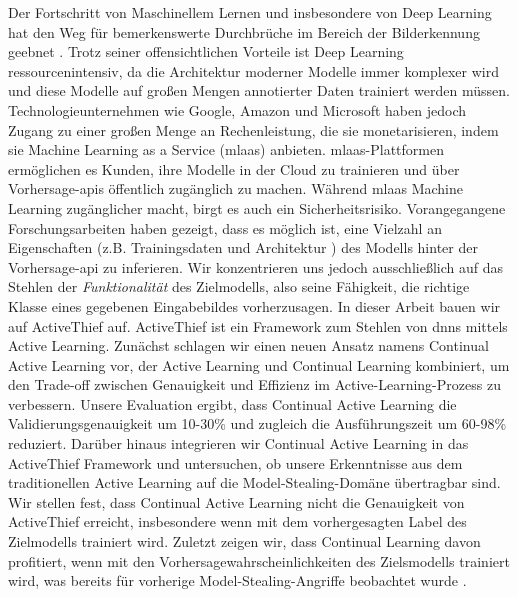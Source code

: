 
\Abstract
Der Fortschritt von Maschinellem Lernen und insbesondere von Deep Learning hat den Weg für bemerkenswerte Durchbrüche im Bereich der Bilderkennung geebnet
\parencite{goodfellow2020generative,he2016deep,lecun1989backpropagation}. Trotz seiner offensichtlichen Vorteile ist Deep Learning ressourcenintensiv, da
die Architektur moderner Modelle immer komplexer wird und diese Modelle auf großen Mengen annotierter Daten trainiert werden müssen. Technologieunternehmen wie Google,
Amazon und Microsoft haben jedoch Zugang zu einer großen Menge an Rechenleistung, die sie monetarisieren, indem sie Machine Learning as a Service (\gls{mlaas}) anbieten.
\gls{mlaas}-Plattformen ermöglichen es Kunden, ihre Modelle in der Cloud zu trainieren und über Vorhersage-\glspl{api} öffentlich zugänglich zu machen.
Während \gls{mlaas} Machine Learning zugänglicher macht, birgt es auch ein Sicherheitsrisiko. Vorangegangene Forschungsarbeiten haben gezeigt, dass es möglich ist,
eine Vielzahl an Eigenschaften (z.B. Trainingsdaten \cite{shokri2017membership} und Architektur \cite{oh2019towards}) des Modells hinter der Vorhersage-\gls{api}
\parencite{papernot2017practical,tramer2016stealing} zu inferieren. Wir konzentrieren uns jedoch ausschließlich auf das Stehlen der \textit{Funktionalität} des Zielmodells,
also seine Fähigkeit, die richtige Klasse eines gegebenen Eingabebildes vorherzusagen. In dieser Arbeit bauen wir auf ActiveThief \cite{pal2020activethief} auf. ActiveThief
ist ein Framework zum Stehlen von \glspl{dnn} mittels Active Learning. Zunächst schlagen wir einen neuen Ansatz namens Continual Active Learning vor, der Active Learning
und Continual Learning kombiniert, um den Trade-off zwischen Genauigkeit und Effizienz im Active-Learning-Prozess zu verbessern. Unsere Evaluation ergibt, dass Continual
Active Learning die Validierungsgenauigkeit um 10-30\% und zugleich die Ausführungszeit um 60-98\% reduziert. Darüber hinaus integrieren wir Continual Active Learning in
das ActiveThief Framework und untersuchen, ob unsere Erkenntnisse aus dem traditionellen Active Learning auf die Model-Stealing-Domäne übertragbar sind. Wir stellen fest,
dass Continual Active Learning nicht die Genauigkeit von ActiveThief erreicht, insbesondere wenn mit dem vorhergesagten Label des Zielmodells trainiert wird. Zuletzt zeigen wir,
dass Continual Learning davon profitiert, wenn mit den Vorhersagewahrscheinlichkeiten des Zielsmodells trainiert wird, was bereits für vorherige Model-Stealing-Angriffe
beobachtet wurde \parencite{orekondy2019knockoff,pal2020activethief}.

